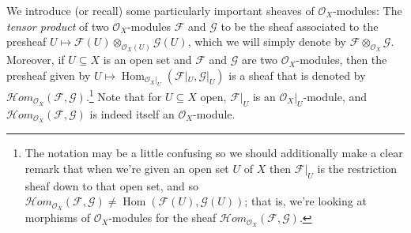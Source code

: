 \documentclass[oneside]{amsart}
\theoremstyle{definition}
\DeclareMathOperator{\Hom}{Hom}
\begin{document}
We introduce (or recall) some particularly important sheaves of $\mathscr O_X$-modules: The \textit{tensor product} of two $\mathscr O_X$-modules $\mathscr F$ and $\mathscr G$ to be the sheaf associated to the presheaf $U \mapsto \mathscr F(U) \otimes_{\mathscr O_X(U)} \mathscr G(U)$, which we will simply denote by $\mathscr F \otimes_{\mathscr O_X} \mathscr G$. Moreover, if $U \subseteq X$ is an open set and $\mathscr F$ and $\mathscr G$ are two $\mathscr O_X$-modules, then the presheaf given by $U \mapsto \Hom_{\mathscr O_X|_U} (\mathscr F |_U, \mathscr G|_U)$ is a sheaf that is denoted by $\mathcal{H}om _{\mathscr O_X} (\mathscr F, \mathscr G)$.\footnote{The notation may be a little confusing so we should additionally make a clear remark that when we're given an open set $U$ of $X$ then $\mathscr F |_U$ is the restriction sheaf down to that open set, and so $\mathcal{H}om _{\mathscr O_X} (\mathscr F, \mathscr G) \neq \Hom (\mathscr F(U), \mathscr G(U))$; that is, we're looking at morphisms of $\mathscr O_X$-modules for the sheaf $\mathcal{H}om _{\mathscr O_X} (\mathscr F, \mathscr G)$. } Note that for $U \subseteq X$ open, $\mathscr F |_U$ is an $\mathscr O_X|_U$-module, and $\mathcal{H}om _{\mathscr O_X} (\mathscr F, \mathscr G)$ is indeed itself an $\mathscr O_X$-module. 
\end{document}
